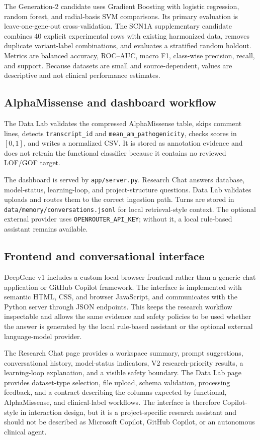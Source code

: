 \documentclass[12pt,a4paper]{article}
\newcommand{\code}[1]{\nolinkurl{#1}}
\begin{document}
The Generation-2 candidate uses Gradient Boosting with logistic regression, random forest, and radial-basis SVM comparisons. Its primary evaluation is leave-one-gene-out cross-validation. The SCN1A supplementary candidate combines 40 explicit experimental rows with existing harmonized data, removes duplicate variant-label combinations, and evaluates a stratified random holdout. Metrics are balanced accuracy, ROC--AUC, macro F1, class-wise precision, recall, and support. Because datasets are small and source-dependent, values are descriptive and not clinical performance estimates.

\subsection{AlphaMissense and dashboard workflow}
The Data Lab validates the compressed AlphaMissense table, skips comment lines, detects \code{transcript\_id} and \code{mean\_am\_pathogenicity}, checks scores in $[0,1]$, and writes a normalized CSV. It is stored as annotation evidence and does not retrain the functional classifier because it contains no reviewed LOF/GOF target.

The dashboard is served by \code{app/server.py}. Research Chat answers database, model-status, learning-loop, and project-structure questions. Data Lab validates uploads and routes them to the correct ingestion path. Turns are stored in \code{data/memory/conversations.jsonl} for local retrieval-style context. The optional external provider uses \code{OPENROUTER\_API\_KEY}; without it, a local rule-based assistant remains available.

\subsection{Frontend and conversational interface}
DeepGene v1 includes a custom local browser frontend rather than a generic chat application or GitHub Copilot framework. The interface is implemented with semantic HTML, CSS, and browser JavaScript, and communicates with the Python server through JSON endpoints. This keeps the research workflow inspectable and allows the same evidence and safety policies to be used whether the answer is generated by the local rule-based assistant or the optional external language-model provider.

The Research Chat page provides a workspace summary, prompt suggestions, conversational history, model-status indicators, V2 research-priority results, a learning-loop explanation, and a visible safety boundary. The Data Lab page provides dataset-type selection, file upload, schema validation, processing feedback, and a contract describing the columns expected by functional, AlphaMissense, and clinical-label workflows. The interface is therefore Copilot-style in interaction design, but it is a project-specific research assistant and should not be described as Microsoft Copilot, GitHub Copilot, or an autonomous clinical agent.
\end{document}
